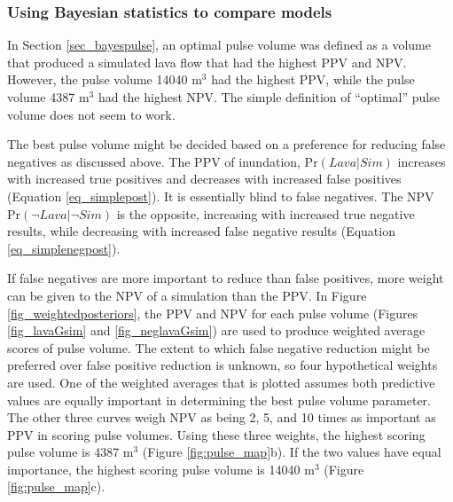		\subsubsection{Using Bayesian statistics to compare models}
		In Section \ref{sec_bayespulse}, an optimal pulse volume was defined as a volume that produced a simulated lava flow that had the highest PPV and NPV. However, the pulse volume 14040 m$^3$ had the highest PPV, while the pulse volume 4387 m$^3$ had the highest NPV. The simple definition of ``optimal'' pulse volume does not seem to work.
		
		The best pulse volume might be decided based on a preference for reducing false negatives as discussed above. The PPV of inundation, $\text{Pr}(Lava|Sim)$ increases with increased true positives and decreases with increased false positives (Equation \ref{eq_simplepost}). It is essentially blind to false negatives. The NPV $\text{Pr}(\neg Lava|\neg Sim)$ is the opposite, increasing with increased true negative results, while decreasing with increased false negative results (Equation \ref{eq_simplenegpost}). 
		
		If false negatives are more important to reduce than false positives, more weight can be given to the NPV of a simulation than the PPV. In Figure \ref{fig_weightedposteriors}, the PPV and NPV for each pulse volume (Figures \ref{fig_lavaGsim} and \ref{fig_neglavaGsim}) are used to produce weighted average scores of pulse volume. The extent to which false negative reduction might be preferred over false positive reduction is unknown, so four hypothetical weights are used. One of the weighted averages that is plotted assumes both predictive values are equally important in determining the best pulse volume parameter. The other three curves weigh NPV as being 2, 5, and 10 times as important as PPV in scoring pulse volumes. Using these three weights, the highest scoring pulse volume is 4387 m$^3$ (Figure \ref{fig:pulse_map}b). If the two values have equal importance, the highest scoring pulse volume is 14040 m$^3$ (Figure \ref{fig:pulse_map}c).
		
